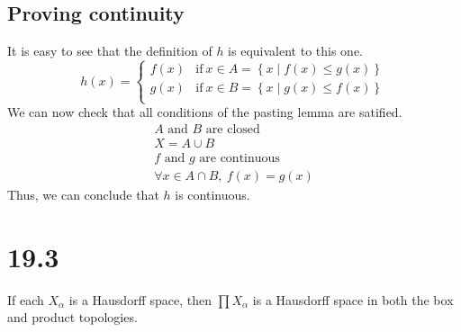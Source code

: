 \documentclass{article}
\begin{document}
\subsection*{Proving continuity}
It is easy to see that the definition of $h$ is equivalent to this one.
\begin{equation*}
    h(x) = \left\{
        \begin{array}{ll}
        f(x) & \mathrm{if\ } x \in A = \left\{x \mid f(x) \leq g(x)\right\} \\
        g(x) & \mathrm{if\ } x \in B = \left\{x \mid g(x) \leq f(x)\right\} \\
        \end{array}
    \right.
\end{equation*}
We can now check that all conditions of the pasting lemma are satified.
\begin{gather*}
    \text{$A$ and $B$ are closed} \\
    X = A \cup B  \\
    \text{$f$ and $g$ are continuous} \\
    \forall x \in A \cap B,\ f(x) = g(x)
\end{gather*}
Thus, we can conclude that $h$ is continuous.
\section*{19.3}
If each $X_\alpha$ is a Hausdorff space, then $\prod X_\alpha$ is a Hausdorff space in both the box and product topologies.
\end{document}
